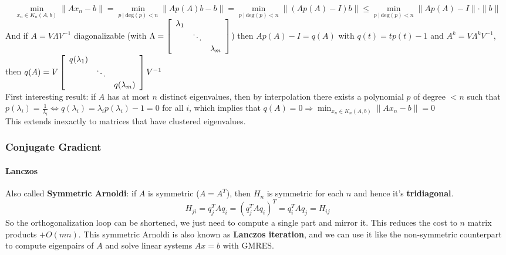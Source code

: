 \documentclass[10pt]{report}
\begin{document}
$$\min_{x_n\in K_n(A,b)} \|Ax_n-b\| = \min_{p\:|\:\text{deg}(p)<n}\|Ap(A)b - b\| =  \min_{p\:|\:\text{deg}(p)<n}\|(Ap(A)-I)b\| \leq \min_{p\:|\:\text{deg}(p)<n}\|Ap(A)-I\|\cdot\|b\|$$
And if $A = V\Lambda V^{-1}$ diagonalizable (with $\Lambda = \left[\begin{array}{c c c}
\lambda_1\\
& \ddots\\
& & \lambda_m
\end{array}\right]$) then $Ap(A)-I = q(A)$ with $q(t) = tp(t)-1$ and $A^k = V\Lambda^kV^{-1}$, then $q(A) = V\left[\begin{array}{c c c}
q(\lambda_1)\\
& \ddots\\
& & q(\lambda_m)
\end{array}\right] V^{-1}$\\
First interesting result: if $A$ has at most $n$ distinct eigenvalues, then by interpolation there exists a polynomial $p$ of degree $< n$ such that $p(\lambda_i)=\frac{1}{\lambda_i}\Leftrightarrow q(\lambda_i)=\lambda_ip(\lambda_i)-1 = 0$ for all $i$, which implies that $q(A) = 0\Rightarrow \min_{x_n\in K_n(A,b)} \|Ax_n - b\| = 0$\\
This extends inexactly to matrices that have clustered eigenvalues.
\subsubsection{Conjugate Gradient}
\paragraph{Lanczos} Also called \textbf{Symmetric Arnoldi}: if $A$ is symmetric ($A=A^T$), then $H_n$ is symmetric for each $n$ and hence it's \textbf{tridiagonal}.
$$H_{ji} = q_j^TAq_i = (q_j^TAq_i)^T=q_i^TAq_j=H_{ij}$$
So the orthogonalization loop can be shortened, we just need to compute a single part and mirror it. This reduces the cost to $n$ matrix products $+O(mn)$. This symmetric Arnoldi is also known as \textbf{Lanczos iteration}, and we can use it like the non-symmetric counterpart to compute eigenpairs of $A$ and solve linear systems $Ax=b$ with GMRES.
\end{document}
